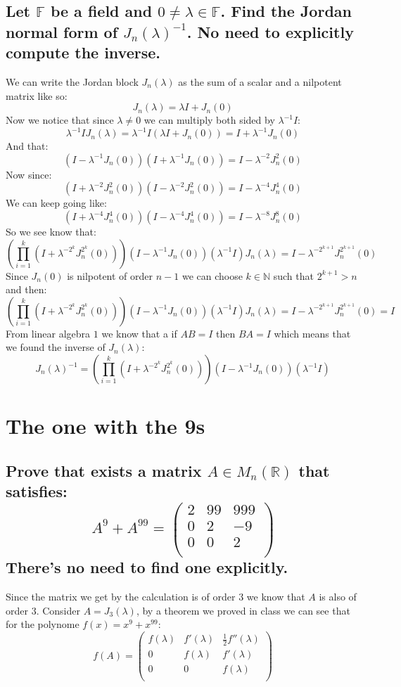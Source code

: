 \documentclass[11pt,a4paper]{article}
\theoremstyle{plain}
\newcommand{\N}{\mathbb{N}}
\newcommand{\R}{\mathbb{R}}
\newcommand{\F}{\mathbb{F}}
\begin{document}
	\subsection{Let $\F$ be a field and $0\neq\lambda\in\F$. Find the Jordan 
	normal form of $J_n(\lambda)^{-1}$. No need to explicitly compute the
	inverse.}
	We can write the Jordan block $J_n(\lambda)$ as the sum of a scalar and
	a nilpotent matrix like so:
	\[
		J_n(\lambda) = \lambda I + J_n(0)
	\]
	Now we notice that since $\lambda \neq 0$ we can multiply both sided by 
	$\lambda^{-1} I$:
	\[
		\lambda^{-1} I J_n(\lambda) =\lambda^{-1} I(\lambda I + J_n(0)) = 
		I + \lambda^{-1}J_n(0)
	\]
	And that:
	\[
		(I - \lambda^{-1}J_n(0))(I + \lambda^{-1}J_n(0)) = 
		I - \lambda^{-2}J_n^2(0)
	\]
	Now since:
	\[
		(I + \lambda^{-2}J_n^2(0))(I - \lambda^{-2}J_n^2(0)) = 
		I - \lambda^{-4}J_n^4(0)
	\]
	We can keep going like:
	\[
		(I + \lambda^{-4}J_n^4(0))(I - \lambda^{-4}J_n^4(0)) = 
		I - \lambda^{-8}J_n^8(0)
	\]
	So we see know that:
	\[
		\left(\prod_{i=1}^{k}{(I + \lambda^{-2^k}J_n^{2^k}(0))}\right)
		(I - \lambda^{-1}J_n(0))(\lambda^{-1} I)J_n(\lambda) = I - \lambda^{-2^{k+1}}
		J_n^{2^{k+1}}(0)
	\]
	Since $J_n(0)$ is nilpotent of order $n-1$ we can choose $k\in\N$ such that
	$2^{k+1} > n$ and then:
	\[
		\left(\prod_{i=1}^{k}{(I + \lambda^{-2^k}J_n^{2^k}(0))}\right)
		(I - \lambda^{-1}J_n(0))(\lambda^{-1} I)J_n(\lambda) = I - \lambda^{-2^{k+1}}
		J_n^{2^{k+1}}(0) = I
	\]
	From linear algebra $1$ we know that a if $AB=I$ then $BA=I$ which means
	that we found the inverse of $J_n(\lambda)$:
	\[
		J_n(\lambda)^{-1} = 
		\left(\prod_{i=1}^{k}{(I + \lambda^{-2^k}J_n^{2^k}(0))}
		\right)(I - \lambda^{-1}J_n(0))(\lambda^{-1} I)
	\]

	\newpage

	\section{The one with the 9s}
	\subsection{Prove that exists a matrix $A\in M_n(\R)$ that satisfies:
	\[
		A^9+A^{99} = \begin{pmatrix}
		2 & 99 & 999\\
		0 & 2 & -9\\
		0 & 0 & 2\\
	\end{pmatrix}
	\] There's no need to find one explicitly.}
	Since the matrix we get by the calculation is of order $3$ we know that $A$
	is also of order $3$. Consider $A = J_3(\lambda)$, by a theorem we proved
	in class we can see that for the polynome $f(x) = x^9 + x^{99}$:
	\[
		f(A) = 
		\begin{pmatrix}
		f(\lambda) & f'(\lambda) & \frac{1}{2}f''(\lambda)\\
		0 & f(\lambda) & f'(\lambda)\\
		0 & 0 & f(\lambda)\\
		\end{pmatrix}
	\]
\end{document}
